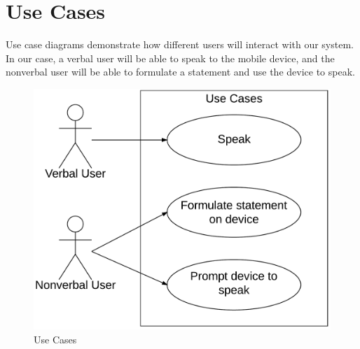 \chapter{Use Cases}

Use case diagrams demonstrate how different users will interact with our system. In our case, a verbal user will be able to speak to the mobile device, and the nonverbal user will be able to formulate a statement and use the device to speak.

\begin{figure}[htb]
\centering
\includegraphics[width=\textwidth]{UseCases.png}
\caption{Use Cases}
\label{fig:useCases}
\end{figure}

